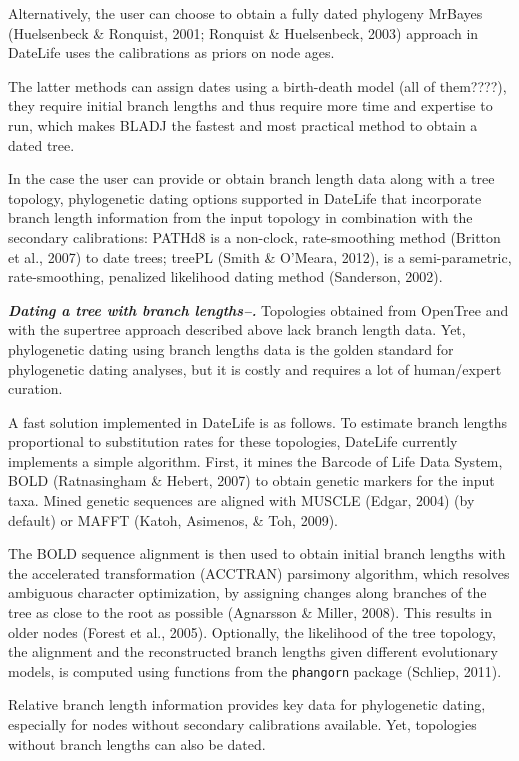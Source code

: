 \documentclass[english,man]{apa6}
\begin{document}
Alternatively, the user can choose to obtain a fully dated phylogeny
MrBayes (Huelsenbeck \& Ronquist, 2001; Ronquist \& Huelsenbeck, 2003) approach in DateLife uses the calibrations as priors on node ages.

The latter methods can assign dates using a birth-death model (all of them????), they require initial branch lengths and thus require more time and expertise to run, which makes BLADJ the fastest and most practical method to obtain a dated tree.

In the case the user can provide or obtain branch length data along with a tree topology, phylogenetic dating options supported in DateLife that incorporate branch length information from the input topology in combination with the secondary calibrations:
PATHd8 is a non-clock, rate-smoothing method (Britton et al., 2007) to date trees;
treePL (Smith \& O'Meara, 2012), is a semi-parametric, rate-smoothing, penalized likelihood dating method (Sanderson, 2002).

\emph{\textbf{Dating a tree with branch lengths--.}}
Topologies obtained from OpenTree and with the supertree approach described above lack branch length data.
Yet, phylogenetic dating using branch lengths data is the golden standard for phylogenetic dating analyses, but it is costly and requires a lot of human/expert curation.

A fast solution implemented in DateLife is as follows.
To estimate branch lengths proportional to substitution rates for these topologies, DateLife currently implements a simple algorithm. First, it mines the Barcode of Life Data System, BOLD (Ratnasingham \& Hebert, 2007) to obtain genetic markers for the input taxa.
Mined genetic sequences are aligned with MUSCLE (Edgar, 2004) (by default) or MAFFT (Katoh, Asimenos, \& Toh, 2009).

The BOLD sequence alignment is then used to obtain initial branch lengths with the accelerated transformation (ACCTRAN) parsimony algorithm, which resolves ambiguous character optimization, by assigning changes along branches of the tree as close to the root as possible (Agnarsson \& Miller, 2008). This results in older nodes (Forest et al., 2005).
Optionally, the likelihood of the tree topology, the alignment and the reconstructed branch lengths given different evolutionary models, is computed using functions from the \texttt{phangorn} package (Schliep, 2011).

Relative branch length information provides key data for phylogenetic dating, especially for nodes without secondary calibrations available. Yet, topologies without branch lengths can also be dated.
\end{document}
